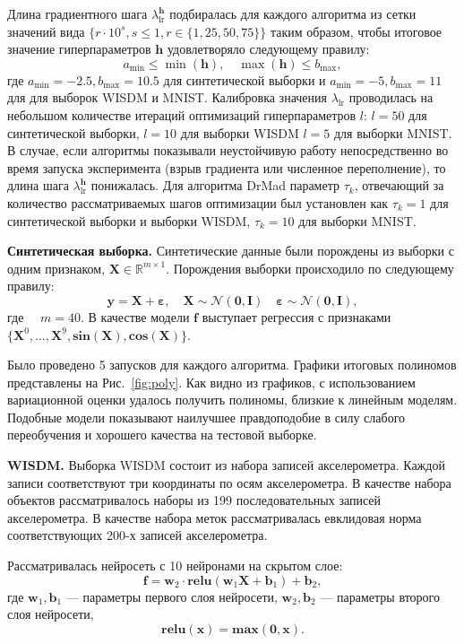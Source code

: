 Длина градиентного шага $ \lambda_{\text{lr}}^{\mathbf{h}}$ подбиралась для каждого алгоритма из сетки значений вида $\{r \cdot 10^{s}, s \leq 1, r \in \{1,25,50,75\}\}$  таким образом, чтобы итоговое значение гиперпараметров  $\mathbf{h}$  удовлетворяло следующему правилу:
\[
    a_\text{min} \leq  \min(\mathbf{h}), \quad \max(\mathbf{h}) \leq b_\text{max},
\] 
где  $a_\text{min} = -2.5, b_\text{max}=10.5$ для синтетической выборки и $a_\text{min} = -5, b_\text{max}=11$ для для выборок WISDM и MNIST.
Калибровка значения $ \lambda_{\text{lr}}$ проводилась на небольшом количестве итераций оптимизаций гиперпараметров $l$:
$l = 50$ для синтетической выборки,  $l=10$ для выборки WISDM $l=5$ для выборки MNIST. В случае, если алгоритмы показывали неустойчивую работу непосредственно во время запуска эксперимента (взрыв градиента или численное переполнение), то длина шага $ \lambda_{\text{lr}}^\mathbf{h}$ понижалась. Для алгоритма DrMad параметр $\tau_k$, отвечающий за количество рассматриваемых шагов оптимизации был установлен как $\tau_k=1$ для синтетической выборки и выборки WISDM, $\tau_k=10$ для выборки MNIST.



\textbf{Синтетическая выборка. }
Синтетические данные были порождены из выборки с одним признаком, $\mathbf{X} \in \mathbb{R}^{m \times 1}$.
Порождения выборки происходило по следующему правилу:
\[
	\mathbf{y} = \mathbf{X} + \boldsymbol{\varepsilon},\quad \mathbf{X}  \sim \mathcal{N}(\mathbf{0}, \mathbf{I}) \quad \boldsymbol{\varepsilon} \sim \mathcal{N}(\mathbf{0}, \mathbf{I}),
\]
где $\quad m = 40.$
В качестве модели $\mathbf{f}$ выступает регрессия с признаками $\{\mathbf{X}^0, \dots, \mathbf{X}^9, \textbf{sin}(\mathbf{X}), \textbf{cos}(\mathbf{X})\}$.

Было проведено 5 запусков для каждого алгоритма.
Графики итоговых полиномов представлены на Рис.~\ref{fig:poly}. Как видно из графиков, с использованием вариационной оценки удалось получить полиномы, близкие к линейным моделям. Подобные модели показывают наилучшее правдоподобие в силу слабого переобучения и хорошего качества на тестовой выборке. 


\textbf{WISDM. }
Выборка WISDM состоит из набора записей акселерометра. Каждой записи соответствуют три координаты по осям акселерометра. В качестве набора объектов рассматривалось наборы из 199 последовательных записей акселерометра. В качестве набора меток рассматривалась евклидовая норма соответствующих 200-х записей акселерометра.

Рассматривалась нейросеть с 10 нейронами на скрытом слое:
\[
    \mathbf{f} = \mathbf{w}_2 \cdot \textbf{relu}(\mathbf{w}_1\mathbf{X} + \mathbf{b}_1) +\mathbf{b}_2,
\]
где $\mathbf{w}_1, \mathbf{b}_1$ --- параметры первого слоя нейросети,
$\mathbf{w}_2, \mathbf{b}_2$ --- параметры второго слоя нейросети,
\[
    \textbf{relu}(\mathbf{x}) = \textbf{max}(\mathbf{0}, \mathbf{x}).
\]

